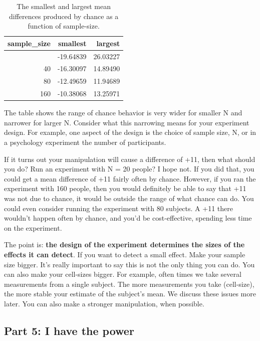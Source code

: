 \documentclass[
  letterpaper,
  DIV=11,
  numbers=noendperiod]{scrreprt}
\begin{document}
\begin{longtable}[]{@{}rrr@{}}

\caption{\label{tbl-5minmax}The smallest and largest mean differences
produced by chance as a function of sample-size.}

\tabularnewline

\toprule\noalign{}
sample\_size & smallest & largest \\
\midrule\noalign{}
\endhead
\bottomrule\noalign{}
\endlastfoot
20 & -19.64839 & 26.03227 \\
40 & -16.30097 & 14.89490 \\
80 & -12.49659 & 11.94689 \\
160 & -10.38068 & 13.25971 \\

\end{longtable}

The table shows the range of chance behavior is very wider for smaller N
and narrower for larger N. Consider what this narrowing means for your
experiment design. For example, one aspect of the design is the choice
of sample size, N, or in a psychology experiment the number of
participants.

If it turns out your manipulation will cause a difference of +11, then
what should you do? Run an experiment with N = 20 people? I hope not. If
you did that, you could get a mean difference of +11 fairly often by
chance. However, if you ran the experiment with 160 people, then you
would definitely be able to say that +11 was not due to chance, it would
be outside the range of what chance can do. You could even consider
running the experiment with 80 subjects. A +11 there wouldn't happen
often by chance, and you'd be cost-effective, spending less time on the
experiment.

The point is: \textbf{the design of the experiment determines the sizes
of the effects it can detect}. If you want to detect a small effect.
Make your sample size bigger. It's really important to say this is not
the only thing you can do. You can also make your cell-sizes bigger. For
example, often times we take several measurements from a single subject.
The more measurements you take (cell-size), the more stable your
estimate of the subject's mean. We discuss these issues more later. You
can also make a stronger manipulation, when possible.

\subsection{Part 5: I have the power}\label{part-5-i-have-the-power}
\end{document}
